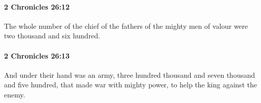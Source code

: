 		\paragraph{2 Chronicles 26:12} %
			\label{2CHRONICLES-26-12}

			The whole number of the chief of the fathers of the mighty men of valour were two thousand and six hundred.


		\paragraph{2 Chronicles 26:13} %
			\label{2CHRONICLES-26-13}

			And under their hand was an army, three hundred thousand and seven thousand and five hundred, that made war with mighty power, to help the king against the enemy.


